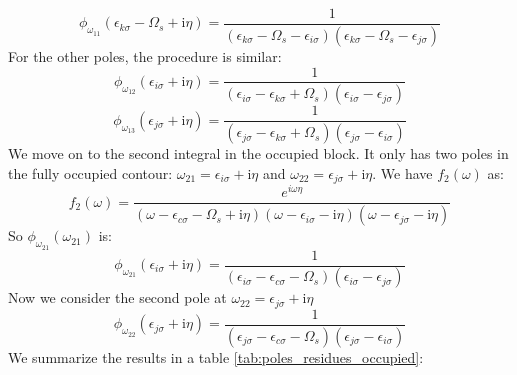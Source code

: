 \documentclass[12pt]{caltech_thesis}
\begin{document}
\begin{equation}
\phi_{\omega_{11}}(\epsilon_{k \sigma} - \Omega_s + \mathrm{i} \eta) = \frac{1}{(\epsilon_{k \sigma} - \Omega_s -\epsilon_{i \sigma})(\epsilon_{k \sigma} - \Omega_s -\epsilon_{j \sigma})}
\end{equation}
For the other poles, the procedure is similar:
\begin{equation}
\phi_{\omega_{12}}(\epsilon_{i \sigma} + \mathrm{i} \eta) = \frac{1}{(\epsilon_{i \sigma} -\epsilon_{k \sigma}+\Omega_s)(\epsilon_{i \sigma} -\epsilon_{j \sigma})}
\end{equation}
\begin{equation}
\phi_{\omega_{13}}(\epsilon_{j \sigma} + \mathrm{i} \eta) = \frac{1}{(\epsilon_{j \sigma} -\epsilon_{k \sigma}+\Omega_s)(\epsilon_{j \sigma} -\epsilon_{i \sigma})}
\end{equation}
We move on to the second integral in the occupied block. It only has two poles in the fully occupied contour: $\omega_{21} = \epsilon _{i\sigma } + \mathrm{i} \eta$ and $\omega_{22} = \epsilon _{j\sigma } + \mathrm{i} \eta$. We have $f_2(\omega)$ as:
\begin{equation}
f_2(\omega) = \frac{e^{i\omega \eta }}{(\omega-\epsilon_{c \sigma}-\Omega_s+\mathrm{i} \eta)(\omega-\epsilon_{i \sigma}-\mathrm{i} \eta)(\omega-\epsilon_{j \sigma}-\mathrm{i} \eta)}
\end{equation}
So $\phi_{\omega_{21}}(\omega _{21})$ is:
\begin{equation}
\phi_{\omega_{21}}(\epsilon_{i \sigma} + \mathrm{i} \eta) = \frac{1}{(\epsilon_{i \sigma} -\epsilon_{c \sigma}-\Omega_s)(\epsilon_{i \sigma} -\epsilon_{j \sigma})}
\end{equation}
Now we consider the second pole at $\omega_{22} = \epsilon _{j\sigma } + \mathrm{i} \eta$
\begin{equation}
\phi_{\omega_{22}}(\epsilon_{j \sigma} + \mathrm{i} \eta) = \frac{1}{(\epsilon_{j \sigma} -\epsilon_{c \sigma}-\Omega_s)(\epsilon_{j \sigma} -\epsilon_{i \sigma})}
\end{equation}
We summarize the results in a table \ref{tab:poles_residues_occupied}:\\
\end{document}
